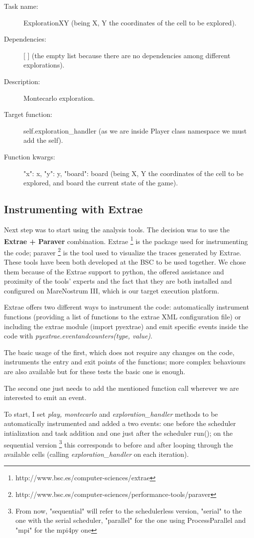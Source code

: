\begin{description}
\item [Task name:] ExplorationXY (being X, Y the coordinates of the cell to be explored).
\item [Dependencies:] [ ] (the empty list because there are no dependencies among different explorations).
\item [Description:] Montecarlo exploration.
\item [Target function:] self.exploration\_handler (as we are inside Player class namespace we must add the self).
\item [Function kwargs:] {"x": x, "y": y, "board": board} (being X, Y the coordinates of the cell to be explored, and board the current state of the game).
\end{description}

\subsection{Instrumenting with Extrae}

Next step was to start using the analysis tools. The decision was to use the  \textbf{Extrae + Paraver} combination. Extrae \footnote{http://www.bsc.es/computer-sciences/extrae} is the package used for instrumenting the code; paraver \footnote{http://www.bsc.es/computer-sciences/performance-tools/paraver} is the tool used to visualize the traces generated by Extrae. These tools have been both developed at the BSC to be used together. We chose them because of the Extrae support to python, the offered assistance and proximity of the tools' experts and the fact that they are both installed and configured on MareNostrum III, which is our target execution platform.

Extrae offers two different ways to instrument the code: automatically instrument functions (providing a list of functions to the extrae XML configuration file) or including the extrae module (import pyextrae)  and emit specific events inside the code with \textit{pyextrae.eventandcounters(type, value)}. 

The basic usage of the first, which  does not require any changes on the code, instruments the entry and exit points of the functions; more complex behaviours are also available but for these tests the basic one is enough. 

The second one just needs to add the mentioned function call wherever we are interested to emit an event.

To start, I set \textit{play, montecarlo} and \textit{exploration\_handler} methods to be automatically instrumented and added a two events: one before the scheduler intialization and task addition and one just after the scheduler run(); on the sequential version \footnote{ From now, "sequential" will refer to the schedulerless version, "serial" to the one with the serial scheduler, "parallel" for the one using ProcessParallel and "mpi" for the mpi4py one} this corresponds to before and after looping through the available cells (calling \textit{exploration\_handler} on each iteration).

